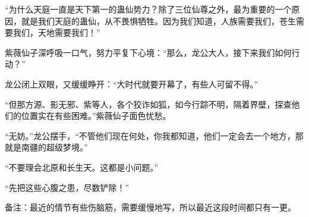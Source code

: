 \begin{this_body}
“为什么天庭一直是天下第一的蛊仙势力？除了三位仙尊之外，最为重要的一个原因，就是我们天庭的蛊仙，从不畏惧牺牲。因为我们知道，人族需要我们，苍生需要我们，天地需要我们！”

紫薇仙子深呼吸一口气，努力平复下心境：“那么，龙公大人，接下来我们如何行动？”

龙公闭上双眼，又缓缓睁开：“大时代就要开幕了，有些人可留不得。”

“但那方源、影无邪、紫等人，各个狡诈如狐，如今行踪不明，隔着界壁，探查他们的位置实在有些困难。”紫薇仙子面色忧愁。

“无妨。”龙公摆手，“不管他们现在何处，你我都知道，他们一定会去一个地方，那就是南疆的超级梦境。”

“不要理会北原和长生天。这都是小问题。”

“先把这些心腹之患，尽数铲除！”

备注：最近的情节有些伤脑筋，需要缓慢地写，所以最近这段时间都只有一更。

\end{this_body}

